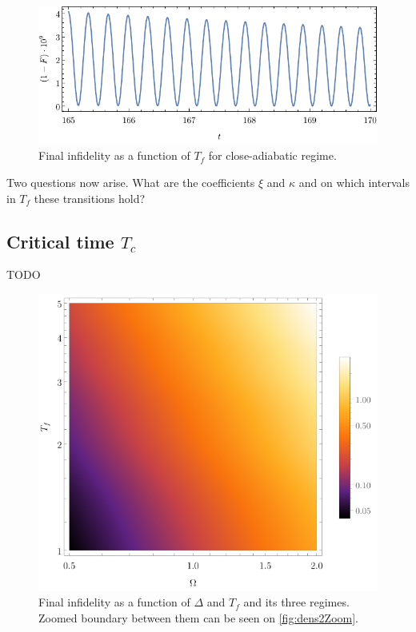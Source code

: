 \begin{figure}[H]
    \centering
    \includegraphics[scale=1.2]{../img/overcritical.pdf}
    \caption{Final infidelity as a function of $T_f$ for close-adiabatic regime.}
    \label{fig:overcritical}
\end{figure}

Two questions now arise. What are the coefficients $\xi$ and $\kappa$ and on which intervals in $T_f$ these transitions hold? 

\subsection{Critical time $T_c$}
TODO

\begin{figure}[H]
    \centering 
    \includegraphics[scale=1.2]{../img/dens2.pdf}
    \caption{Final infidelity as a function of $\Delta$ and $T_f$ and its three regimes. Zoomed boundary between them can be seen on \ref{fig:dens2Zoom}.}
    \label{fig:dens2}
\end{figure}

